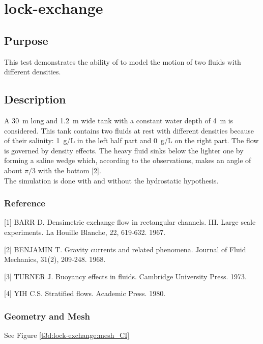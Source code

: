 \chapter{lock-exchange}
%
%
\section{Purpose}
%
This test demonstrates the ability of  to model the motion
of two fluids with different densities.
%
\section{Description}
%
A 30~m long and 1.2~m wide tank with a constant water depth of 4~m is
considered.
This tank contains two fluids at rest with different densities because
of their salinity:
1~g/L in the left half part and 0~g/L on the right part.
The flow is governed by density effects.
The heavy fluid sinks below the lighter one by forming a saline wedge
which, according to the observations, makes an angle of about $\pi/3$
with the bottom [2].\\
The simulation is done with and without the hydrostatic hypothesis.
%
%
%
%
\subsection{Reference}
%
[1] BARR D. Densimetric exchange flow in rectangular channels.
III. Large scale experiments. La Houille Blanche, 22, 619-632. 1967.

[2] BENJAMIN T. Gravity currents and related phenomena.
Journal of Fluid Mechanics, 31(2), 209-248. 1968.

[3] TURNER J. Buoyancy effects in fluids. Cambridge University Press.
1973.

[4] YIH C.S. Stratified flows. Academic Press. 1980.
%
%
%
\subsection{Geometry and Mesh}
%
See Figure \ref{t3d:lock-exchange:mesh_CI}
%
